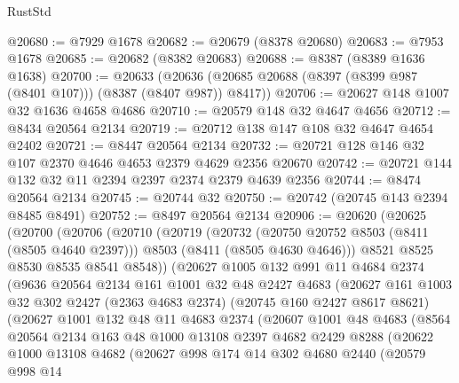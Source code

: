 \begin{lexlean}{RustStd}
\begin{coremodule}
@20680 := @7929 @1678
@20682 := @20679 (@8378 @20680)
@20683 := @7953 @1678
@20685 := @20682 (@8382 @20683)
@20688 := @8387 (@8389 @1636 @1638)
@20700 := @20633
    (@20636 (@20685 @20688 (@8397 (@8399 @987 (@8401 @107))) (@8387 (@8407 @987)) @8417))
@20706 := @20627 @148 @1007 @32 @1636 @4658 @4686
@20710 := @20579 @148 @32 @4647 @4656
@20712 := @8434 @20564 @2134
@20719 := @20712 @138 @147 @108 @32 @4647 @4654 @2402
@20721 := @8447 @20564 @2134
@20732 := @20721 @128 @146 @32 @107 @2370 @4646 @4653 @2379 @4629 @2356 @20670
@20742 := @20721 @144 @132 @32 @11 @2394 @2397 @2374 @2379 @4639 @2356
@20744 := @8474 @20564 @2134
@20745 := @20744 @32
@20750 := @20742 (@20745 @143 @2394 @8485 @8491)
@20752 := @8497 @20564 @2134
@20906 := @20620
    (@20625
      (@20700
        (@20706
          (@20710
            (@20719
              (@20732
                (@20750 @20752 @8503 (@8411 (@8505 @4640 @2397)))
                @8503
                (@8411 (@8505 @4630 @4646)))
              @8521
              @8525
              @8530
              @8535
              @8541
              @8548))
          (@20627
            @1005
            @132
            @991
            @11
            @4684
            @2374
            (@9636
              @20564
              @2134
              @161
              @1001
              @32
              @48
              @2427
              @4683
              (@20627
                @161
                @1003
                @32
                @302
                @2427
                (@2363 @4683 @2374)
                (@20745 @160 @2427 @8617 @8621)
                (@20627
                  @1001
                  @132
                  @48
                  @11
                  @4683
                  @2374
                  (@20607
                    @1001
                    @48
                    @4683
                    (@8564
                      @20564
                      @2134
                      @163
                      @48
                      @1000
                      @13108
                      @2397
                      @4682
                      @2429
                      @8288
                      (@20622
                        @1000
                        @13108
                        @4682
                        (@20627
                          @998
                          @174
                          @14
                          @302
                          @4680
                          @2440
                          (@20579
                            @998
                            @14

\end{coremodule}
\end{lexlean}
